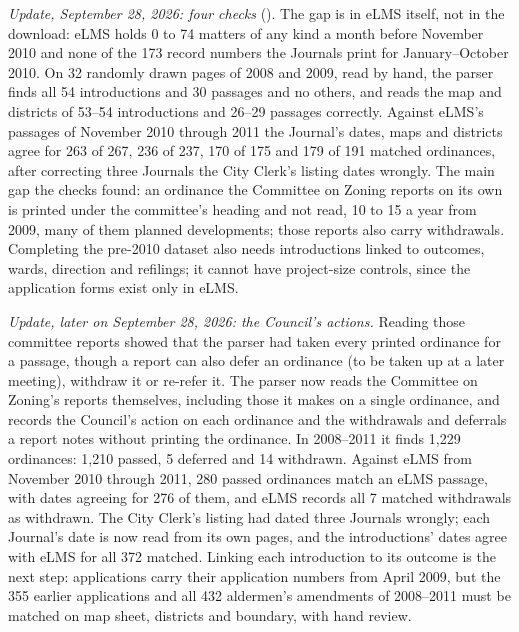 \textit{Update, September 28, 2026: four checks} (). The gap is in
eLMS itself, not in the download: eLMS holds 0 to 74 matters of any kind a month before November 2010 and none of the
173 record numbers the Journals print for January--October 2010. On 32 randomly drawn pages of 2008 and 2009, read
by hand, the parser finds all 54 introductions and 30 passages and no others, and reads the map and districts of
53--54 introductions and 26--29 passages correctly. Against eLMS's passages of November 2010 through 2011 the
Journal's dates, maps and districts agree for 263 of 267, 236 of 237, 170 of 175 and 179 of 191 matched ordinances,
after correcting three Journals the City Clerk's listing dates wrongly. The main gap the checks found: an ordinance
the Committee on Zoning reports on its own is printed under the committee's heading and not read, 10 to 15 a year
from 2009, many of them planned developments; those reports also carry withdrawals. Completing the pre-2010 dataset
also needs introductions linked to outcomes, wards, direction and refilings; it cannot have project-size controls,
since the application forms exist only in eLMS.

\textit{Update, later on September 28, 2026: the Council's actions.} Reading those committee reports showed that the
parser had taken every printed ordinance for a passage, though a report can also defer an ordinance (to be taken up
at a later meeting), withdraw it or re-refer it. The parser now reads the Committee on Zoning's reports themselves,
including those it makes on a single ordinance, and records the Council's action on each ordinance and the
withdrawals and deferrals a report notes without printing the ordinance. In 2008--2011 it finds 1,229 ordinances:
1,210 passed, 5 deferred and 14 withdrawn. Against eLMS from November 2010 through 2011, 280 passed ordinances match
an eLMS passage, with dates agreeing for 276 of them, and eLMS records all 7 matched withdrawals as withdrawn. The
City Clerk's listing had dated three Journals wrongly; each Journal's date is now read from its own pages, and the
introductions' dates agree with eLMS for all 372 matched. Linking each introduction to its outcome is the next step:
applications carry their application numbers from April 2009, but the 355 earlier applications and all 432
aldermen's amendments of 2008--2011 must be matched on map sheet, districts and boundary, with hand review.

